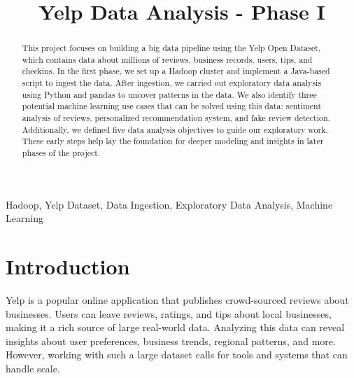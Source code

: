 \documentclass[conference]{IEEEtran}
\begin{document}
\title{Yelp Data Analysis - Phase I}

\author{
\and
{}
\and
{}
}

\maketitle

\begin{abstract}
This project focuses on building a big data pipeline using the Yelp Open Dataset,
which contains data about millions of reviews, business records, users, tips, and
checkins. In the first phase, we set up a Hadoop cluster and implement a Java-based
script to ingest the data. After ingestion, we carried out exploratory data analysis
using Python and pandas to uncover patterns in the data. We also identify three
potential machine learning use cases that can be solved using this data: sentiment
analysis of reviews, personalized recommendation system, and fake review detection.
Additionally, we defined five data analysis objectives to guide our exploratory
work. These early steps help lay the foundation for deeper modeling and insights
in later phases of the project.
\end{abstract}

\begin{IEEEkeywords}
Hadoop, Yelp Dataset, Data Ingestion, Exploratory Data Analysis, Machine Learning
\end{IEEEkeywords}

\section{Introduction}
Yelp is a popular online application that publishes crowd-sourced reviews about
businesses. Users can leave reviews, ratings, and tips about local businesses,
making it a rich source of large real-world data. Analyzing this data can reveal
insights about user preferences, business trends, regional patterns, and more.
However, working with such a large dataset calls for tools and systems that can
handle scale.
\end{document}
